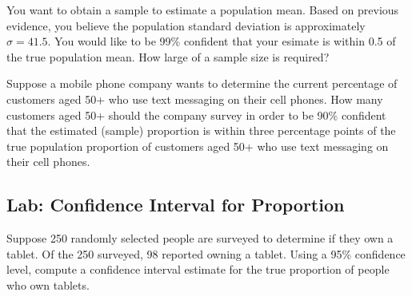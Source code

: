 \begin{exercise}

You want to obtain a sample to estimate a population mean. Based on
previous evidence, you believe the population standard deviation is
approximately $\sigma=41.5$. You would like to be
99\% confident that your esimate is within 0.5 of the true population
mean. How large of a sample size is required?

\end{exercise}
\vspace*{8\baselineskip}

\begin{exercise}

Suppose a mobile phone company wants to determine the current percentage
of customers aged 50+ who use text messaging on their cell phones. How
many customers aged 50+ should the company survey in order to be 90\%
confident that the estimated (sample) proportion is within three
percentage points of the true population proportion of customers aged
50+ who use text messaging on their cell phones.

\end{exercise}
\vspace*{8\baselineskip}

\subsection{Lab: Confidence Interval for Proportion}


\begin{exercise}
  
  Suppose 250 randomly selected people are surveyed to determine if they own a tablet. Of the 250 surveyed, 98 reported owning a tablet. Using a 95\% confidence level, compute a confidence interval estimate for the true proportion of people who own tablets.

\end{exercise}
\vspace*{8\baselineskip}

